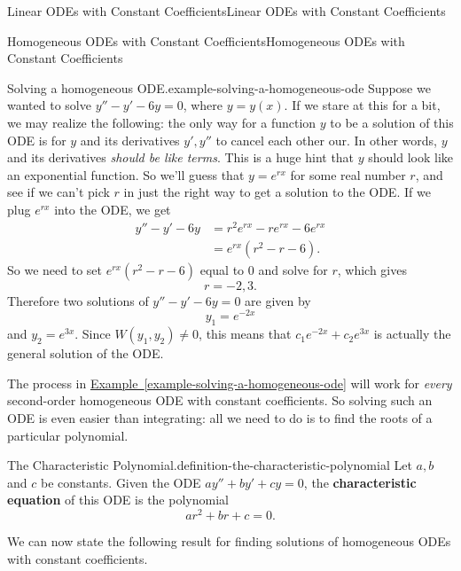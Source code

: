 \documentclass[10pt,]{book}
\newcommand{\terminology}[1]{\textbf{#1}}
\numberwithin{equation}{section}
\newcommand{\amp}{&}
\begin{document}
\begin{chapterptx}{Linear ODEs with Constant Coefficients}{}{Linear ODEs with Constant Coefficients}{}{}
\begin{sectionptx}{Homogeneous ODEs with Constant Coefficients}{}{Homogeneous ODEs with Constant Coefficients}{}{}
\begin{example}{Solving a homogeneous ODE.}{example-solving-a-homogeneous-ode}%
\hypertarget{p-180}{}%
Suppose we wanted to solve \(y'' - y' - 6y = 0\), where \(y=y(x)\). If we stare at this for a bit, we may realize the following: the only way for a function \(y\) to be a solution of this ODE is for \(y\) and its derivatives \(y',y''\) to cancel each other our. In other words, \(y\) and its derivatives \emph{should be like terms}. This is a huge hint that \(y\) should look like an exponential function. So we'll guess that \(y = e^{rx}\) for some real number \(r\), and see if we can't pick \(r\) in just the right way to get a solution to the ODE. If we plug \(e^{rx}\) into the ODE, we get%
%
\begin{align*}
y''- y' - 6y \amp = r^{2}e^{rx} - re^{rx} - 6e^{rx} \\
\amp = e^{rx}(r^{2} - r - 6). 
\end{align*}
\hypertarget{p-181}{}%
So we need to set \(e^{rx}(r^{2} - r - 6)\) equal to \(0\) and solve for \(r\), which gives%
\begin{equation*}
r = -2, 3.
\end{equation*}
Therefore two solutions of \(y'' - y' - 6y = 0\) are given by%
\begin{equation*}
y_{1} = e^{-2x}
\end{equation*}
and \(y_{2} = e^{3x}\). Since \(W(y_{1},y_{2})\neq0\), this means that \(c_{1}e^{-2x} + c_{2}e^{3x}\) is actually the general solution of the ODE.%
\end{example}
\hypertarget{p-182}{}%
The process in \hyperref[example-solving-a-homogeneous-ode]{Example~\ref{example-solving-a-homogeneous-ode}} will work for \emph{every} second-order homogeneous ODE with constant coefficients. So solving such an ODE is even easier than integrating: all we need to do is to find the roots of a particular polynomial.%
\begin{definition}{The Characteristic Polynomial.}{definition-the-characteristic-polynomial}%
\hypertarget{p-183}{}%
Let \(a,b\) and \(c\) be constants. Given the ODE \(ay'' + by' + cy = 0\), the \terminology{characteristic equation} of this ODE is the polynomial%
\begin{equation*}
ar^{2} + br + c = 0.
\end{equation*}
%
\end{definition}
\hypertarget{p-184}{}%
We can now state the following result for finding solutions of homogeneous ODEs with constant coefficients.%

\end{sectionptx}
\end{chapterptx}
\end{document}
